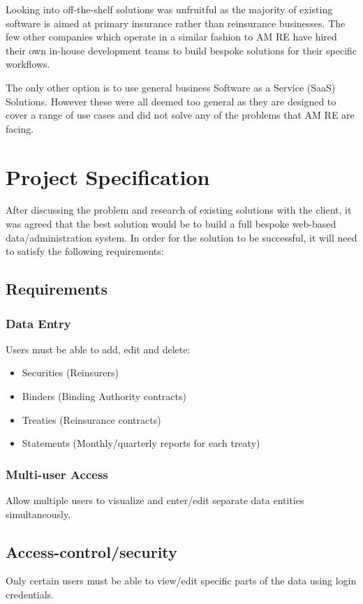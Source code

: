\documentclass[12pt]{article}
\begin{document}
Looking into off-the-shelf solutions was unfruitful as the majority of existing software is aimed at primary insurance rather than reinsurance businesses. The few other companies which operate in a similar fashion to AM RE have hired their own in-house development teams to build bespoke solutions for their specific workflows.

The only other option is to use general business Software as a Service (SaaS) Solutions. However these were all deemed too general as they are designed to cover a range of use cases and did not solve any of the problems that AM RE are facing.

\section{Project Specification}
After discussing the problem and research of existing solutions with the client, it was agreed that the best solution would be to build a full bespoke web-based data/administration system. In order for the solution to be successful, it will need to satisfy the following requirements:

\subsection{Requirements}

\subsubsection*{Data Entry}
Users must be able to add, edit and delete:
\begin{itemize}
    \item Securities (Reinsurers)
    \item Binders (Binding Authority contracts)
    \item Treaties (Reinsurance contracts)
    \item Statements (Monthly/quarterly reports for each treaty)
\end{itemize}

\subsubsection*{Multi-user Access}
Allow multiple users to visualize and enter/edit separate data entities simultaneously.
\subsection*{Access-control/security}
Only certain users must be able to view/edit specific parts of the data using login credentials.
\end{document}
